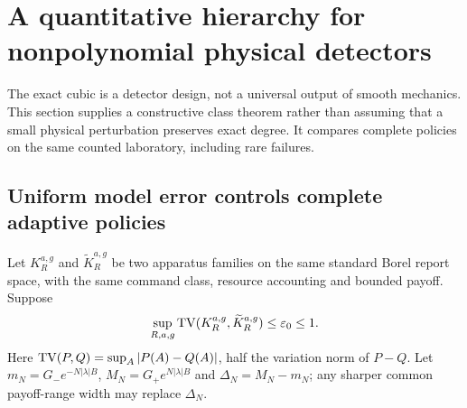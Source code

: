 \section{A quantitative hierarchy for nonpolynomial physical detectors}\label{sec:hierarchy}
The exact cubic is a detector design, not a universal output of smooth mechanics. This section supplies a constructive class theorem rather than assuming that a small physical perturbation preserves exact degree. It compares complete policies on the same counted laboratory, including rare failures.

\subsection{Uniform model error controls complete adaptive policies}
Let $K_R^{a,g}$ and $\widetilde K_R^{a,g}$ be two apparatus families on the same standard Borel report space, with the same command class, resource accounting and bounded payoff. Suppose
\begin{equation}
 \sup_{R,a,g}\operatorname{TV}(K_R^{a,g},\widetilde K_R^{a,g})\le\varepsilon_0\le1.
 \label{eq:model-tv}
\end{equation}
Here $\operatorname{TV}(P,Q)=\sup_A|P(A)-Q(A)|$, half the variation norm of $P-Q$. Let
$m_N=G_-e^{-N|\lambda|B}$, $M_N=G_+e^{N|\lambda|B}$ and $\Delta_N=M_N-m_N$; any sharper common payoff-range width may replace $\Delta_N$.

